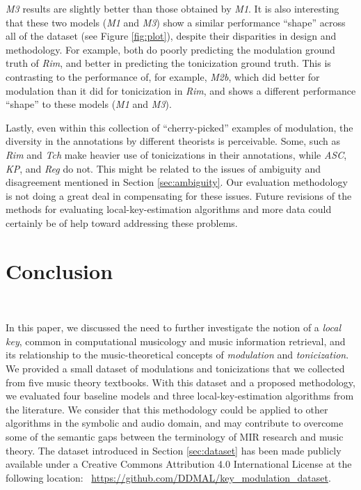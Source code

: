 \documentclass[sigconf]{acmart}
\begin{document}
\emph{M3} results are slightly better than those obtained by \emph{M1}. 
It is also interesting that these two models (\emph{M1} and \emph{M3}) show a similar performance ``shape'' across all of the dataset (see Figure \ref{fig:plot}), despite their disparities in design and methodology. 
For example, both do poorly predicting the modulation ground truth of \emph{Rim}, and better in predicting the tonicization ground truth. 
This is contrasting to the performance of, for example, \emph{M2b}, which did better for modulation than it did for tonicization in \emph{Rim}, and shows a different performance ``shape'' to these models (\emph{M1} and \emph{M3}). 

Lastly, even within this collection of ``cherry-picked'' examples of modulation, the diversity in the annotations by different theorists is perceivable. 
Some, such as \emph{Rim} and \emph{Tch} make heavier use of tonicizations in their annotations, while \emph{ASC}, \emph{KP}, and \emph{Reg} do not. 
This might be related to the issues of ambiguity and disagreement mentioned in Section \ref{sec:ambiguity}. 
Our evaluation methodology is not doing a great deal in compensating for these issues. Future revisions of the methods for evaluating local-key-estimation algorithms and more data could certainly be of help toward addressing these problems.

\section{Conclusion}~\label{sec:discussion}

In this paper, we discussed the need to further investigate the notion of a \emph{local key}, common in computational musicology and music information retrieval, and its relationship to the music-theoretical concepts of \emph{modulation} and \emph{tonicization}. 
We provided a small dataset of modulations and tonicizations that we collected from five music theory textbooks. 
With this dataset and a proposed methodology, we evaluated four baseline models and three local-key-estimation algorithms from the literature. 
We consider that this methodology could be applied to other algorithms in the symbolic and audio domain, and may contribute to overcome some of the semantic gaps between the terminology of MIR research and music theory. 
The dataset introduced in Section \ref{sec:dataset} has been made publicly available under a Creative Commons Attribution 4.0 International License at the following location: ~\url{https://github.com/DDMAL/key_modulation_dataset}.
\end{document}
